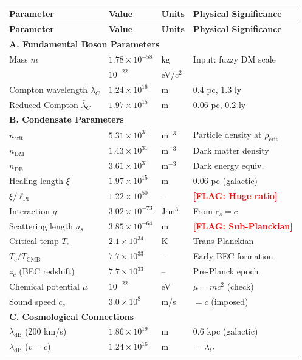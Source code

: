 \documentclass[11pt,a4paper]{article}
\newcommand{\ee}[1]{\times 10^{#1}}
\newcommand{\lPl}{\ensuremath{\ell_{\mathrm{Pl}}}}
\newcommand{\rhocrit}{\ensuremath{\rho_{\mathrm{crit}}}}
\newcommand{\lambdadB}{\ensuremath{\lambda_{\mathrm{dB}}}}
\newcommand{\FLAG}[1]{\textcolor{red}{\textbf{[FLAG: #1]}}}
\begin{document}
\begin{longtable}{@{}p{4.5cm}p{3.5cm}p{3cm}p{4cm}@{}}
\toprule
\textbf{Parameter} & \textbf{Value} & \textbf{Units} & \textbf{Physical Significance} \\
\midrule
\endfirsthead
\toprule
\textbf{Parameter} & \textbf{Value} & \textbf{Units} & \textbf{Physical Significance} \\
\midrule
\endhead
\multicolumn{4}{l}{\textbf{A. Fundamental Boson Parameters}} \\
\midrule
Mass $m$ & $1.78 \ee{-58}$ & kg & Input: fuzzy DM scale \\
 & $10^{-22}$ & eV/$c^2$ & \\
Compton wavelength $\lambda_C$ & $1.24 \ee{16}$ & m & 0.4 pc, 1.3 ly \\
Reduced Compton $\bar{\lambda}_C$ & $1.97 \ee{15}$ & m & 0.06 pc, 0.2 ly \\
\midrule
\multicolumn{4}{l}{\textbf{B. Condensate Parameters}} \\
\midrule
$n_{\mathrm{crit}}$ & $5.31 \ee{31}$ & m$^{-3}$ & Particle density at $\rhocrit$ \\
$n_{\mathrm{DM}}$ & $1.43 \ee{31}$ & m$^{-3}$ & Dark matter density \\
$n_{\mathrm{DE}}$ & $3.61 \ee{31}$ & m$^{-3}$ & Dark energy equiv. \\
Healing length $\xi$ & $1.97 \ee{15}$ & m & 0.06 pc (galactic) \\
$\xi/\lPl$ & $1.22 \ee{50}$ & -- & \FLAG{Huge ratio} \\
Interaction $g$ & $3.02 \ee{-73}$ & J$\cdot$m$^3$ & From $c_s = c$ \\
Scattering length $a_s$ & $3.85 \ee{-64}$ & m & \FLAG{Sub-Planckian} \\
Critical temp $T_c$ & $2.1 \ee{34}$ & K & Trans-Planckian \\
$T_c/T_{\mathrm{CMB}}$ & $7.7 \ee{33}$ & -- & Early BEC formation \\
$z_c$ (BEC redshift) & $7.7 \ee{33}$ & -- & Pre-Planck epoch \\
Chemical potential $\mu$ & $10^{-22}$ & eV & $\mu = mc^2$ (check) \\
Sound speed $c_s$ & $3.0 \ee{8}$ & m/s & $= c$ (imposed) \\
\midrule
\multicolumn{4}{l}{\textbf{C. Cosmological Connections}} \\
\midrule
$\lambdadB$ (200 km/s) & $1.86 \ee{19}$ & m & 0.6 kpc (galactic) \\
$\lambdadB$ ($v = c$) & $1.24 \ee{16}$ & m & $= \lambda_C$ \\

\end{longtable}
\end{document}
